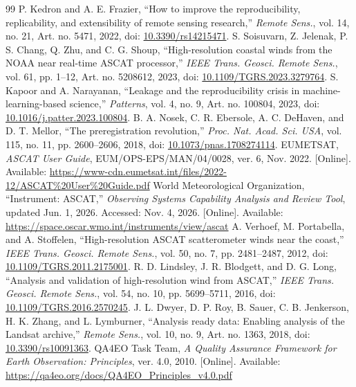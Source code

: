 \begin{thebibliography}{99}
 P. Kedron and A. E. Frazier, ``How to improve the reproducibility, replicability, and extensibility of remote sensing research,'' \emph{Remote Sens.}, vol. 14, no. 21, Art. no. 5471, 2022, doi: \href{https://doi.org/10.3390/rs14215471}{10.3390/rs14215471}.
 S. Soisuvarn, Z. Jelenak, P. S. Chang, Q. Zhu, and C. G. Shoup, ``High-resolution coastal winds from the NOAA near real-time ASCAT processor,'' \emph{IEEE Trans. Geosci. Remote Sens.}, vol. 61, pp. 1--12, Art. no. 5208612, 2023, doi: \href{https://doi.org/10.1109/TGRS.2023.3279764}{10.1109/TGRS.2023.3279764}.
 S. Kapoor and A. Narayanan, ``Leakage and the reproducibility crisis in machine-learning-based science,'' \emph{Patterns}, vol. 4, no. 9, Art. no. 100804, 2023, doi: \href{https://doi.org/10.1016/j.patter.2023.100804}{10.1016/j.patter.2023.100804}.
 B. A. Nosek, C. R. Ebersole, A. C. DeHaven, and D. T. Mellor, ``The preregistration revolution,'' \emph{Proc. Nat. Acad. Sci. USA}, vol. 115, no. 11, pp. 2600--2606, 2018, doi: \href{https://doi.org/10.1073/pnas.1708274114}{10.1073/pnas.1708274114}.
 EUMETSAT, \emph{ASCAT User Guide}, EUM/OPS-EPS/MAN/04/0028, ver. 6, Nov. 2022. [Online]. Available: \url{https://www-cdn.eumetsat.int/files/2022-12/ASCAT%20User%20Guide.pdf}
 World Meteorological Organization, ``Instrument: ASCAT,'' \emph{Observing Systems Capability Analysis and Review Tool}, updated Jun. 1, 2026. Accessed: Nov. 4, 2026. [Online]. Available: \url{https://space.oscar.wmo.int/instruments/view/ascat}
 A. Verhoef, M. Portabella, and A. Stoffelen, ``High-resolution ASCAT scatterometer winds near the coast,'' \emph{IEEE Trans. Geosci. Remote Sens.}, vol. 50, no. 7, pp. 2481--2487, 2012, doi: \href{https://doi.org/10.1109/TGRS.2011.2175001}{10.1109/TGRS.2011.2175001}.
 R. D. Lindsley, J. R. Blodgett, and D. G. Long, ``Analysis and validation of high-resolution wind from ASCAT,'' \emph{IEEE Trans. Geosci. Remote Sens.}, vol. 54, no. 10, pp. 5699--5711, 2016, doi: \href{https://doi.org/10.1109/TGRS.2016.2570245}{10.1109/TGRS.2016.2570245}.
 J. L. Dwyer, D. P. Roy, B. Sauer, C. B. Jenkerson, H. K. Zhang, and L. Lymburner, ``Analysis ready data: Enabling analysis of the Landsat archive,'' \emph{Remote Sens.}, vol. 10, no. 9, Art. no. 1363, 2018, doi: \href{https://doi.org/10.3390/rs10091363}{10.3390/rs10091363}.
 QA4EO Task Team, \emph{A Quality Assurance Framework for Earth Observation: Principles}, ver. 4.0, 2010. [Online]. Available: \url{https://qa4eo.org/docs/QA4EO_Principles_v4.0.pdf}

\end{thebibliography}
